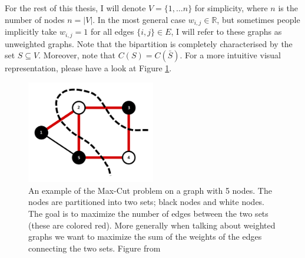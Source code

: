 For the rest of this thesis, I will denote $V = \{1,\dots n\}$ for simplicity, where $n$ is the number of nodes $n = |V|$. In the most general case $w_{i,j} \in \mathbb{R}$, but sometimes people implicitly take $w_{i,j} = 1$ for all edges $\{i,j\} \in E$, I will refer to these graphs as unweighted graphs.
Note that the bipartition is completely characterised by the set $S \subseteq V$. Moreover, note that $C(S) = C(\bar{S})$. For a more intuitive visual representation, please have a look at Figure \ref{fig:MaxCut}. 
\begin{figure}[H]
	\centering
	\includegraphics[width=0.5\textwidth]{figures/MaxCut.png}
	\caption{An example of the Max-Cut problem on a graph with 5 nodes. The nodes are partitioned into two sets; black nodes and white nodes. The goal is to maximize the number of edges between the two sets (these are colored red). More generally when talking about weighted graphs we want to maximize the sum of the weights of the edges connecting the two sets. Figure from \cite{wiki:MaxCut}}
	\label{fig:MaxCut}
\end{figure}


